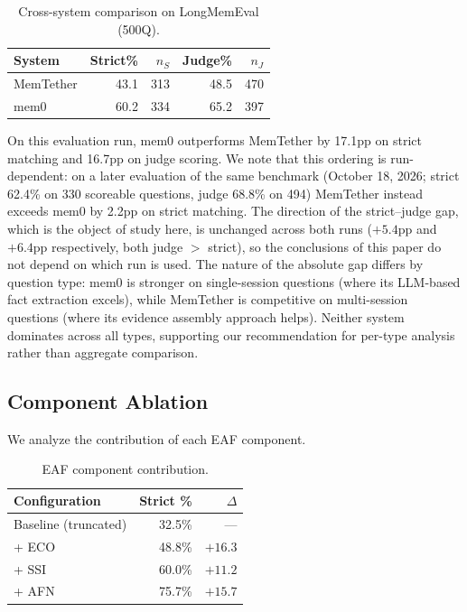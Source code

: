 \documentclass[10pt]{article}
\begin{document}
\begin{table}[h]
\centering
\caption{Cross-system comparison on LongMemEval (500Q).}
\label{tab:mem0}
\begin{tabular}{lrrrr}
\toprule
System & Strict\% & $n_S$ & Judge\% & $n_J$ \\
\midrule
MemTether & 43.1 & 313 & 48.5 & 470 \\
mem0 & 60.2 & 334 & 65.2 & 397 \\
\bottomrule
\end{tabular}
\end{table}

On this evaluation run, mem0 outperforms MemTether by 17.1pp on strict matching and 16.7pp on judge scoring. We note that this ordering is run-dependent: on a later evaluation of the same benchmark (October 18, 2026; strict 62.4\% on 330 scoreable questions, judge 68.8\% on 494) MemTether instead exceeds mem0 by 2.2pp on strict matching. The direction of the strict--judge gap, which is the object of study here, is unchanged across both runs ($+5.4$pp and $+6.4$pp respectively, both judge $>$ strict), so the conclusions of this paper do not depend on which run is used. The nature of the absolute gap differs by question type: mem0 is stronger on single-session questions (where its LLM-based fact extraction excels), while MemTether is competitive on multi-session questions (where its evidence assembly approach helps). Neither system dominates across all types, supporting our recommendation for per-type analysis rather than aggregate comparison.



\subsection{Component Ablation}
We analyze the contribution of each EAF component.

\begin{table}[t]
\centering
\caption{EAF component contribution.}
\label{tab:eaf-ablation}
\begin{tabular}{lrr}
\toprule
Configuration & Strict \% & $\Delta$ \\
\midrule
Baseline (truncated) & 32.5\% & --- \\
+ ECO & 48.8\% & $+16.3$ \\
+ SSI & 60.0\% & $+11.2$ \\
+ AFN & 75.7\% & $+15.7$ \\
\bottomrule
\end{tabular}
\end{table}
\end{document}
